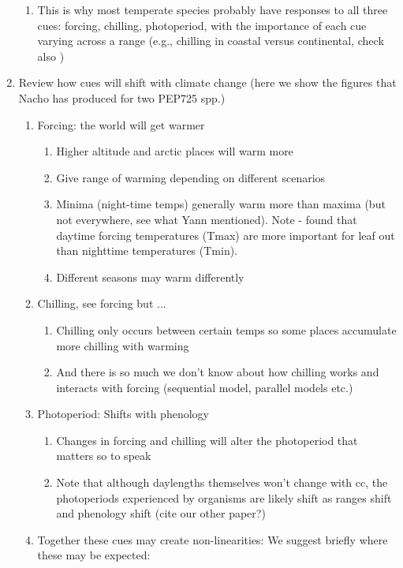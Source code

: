 \documentclass[11pt,letterpaper]{article}
\begin{document}
\begin{enumerate}
\begin{enumerate}
\item This is why most temperate species probably have responses to all three cues: forcing, chilling, photoperiod, with the importance of each cue varying across a range (e.g., chilling in coastal versus continental, check also \citet{legave2013})
\end{enumerate}
\item Review how cues will shift with climate change (here we show the figures that Nacho has produced for two PEP725 spp.) %
\begin{enumerate}
\item Forcing: the world will get warmer 
\begin{enumerate}
\item Higher altitude and arctic places will warm more
\item Give range of warming depending on different scenarios
\item Minima (night-time temps) generally warm more than maxima (but not everywhere, see what Yann mentioned). Note \citet{piao2015}- found that daytime forcing temperatures (Tmax) are more important for leaf out than nighttime temperatures (Tmin).
\item Different seasons may warm differently
\end{enumerate}
\item Chilling, see forcing but ... 
\begin{enumerate}
\item Chilling only occurs between certain temps so some places accumulate more chilling with warming
\item And there is so much we don't know about how chilling works and interacts with forcing (sequential model, parallel models etc.)
\end{enumerate}
\item Photoperiod: Shifts with phenology
\begin{enumerate}
\item Changes in forcing and chilling will alter the photoperiod that matters so to speak
\item Note that although daylengths themselves won't change with cc, the photoperiods experienced by organisms are likely shift as ranges shift and phenology shift (cite our other paper?)
\end{enumerate}
\item Together these cues may create non-linearities: We suggest briefly where these may be expected:

\end{enumerate}
\end{enumerate}
\end{document}
